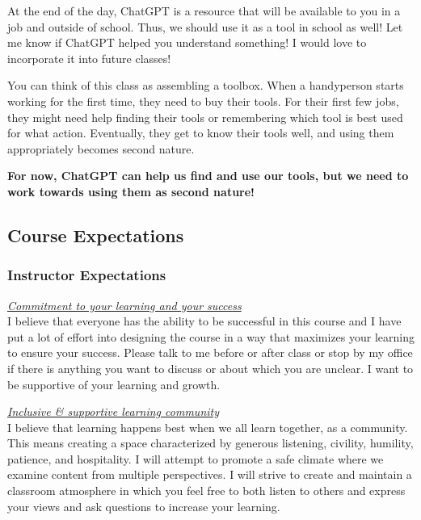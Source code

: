 \documentclass[
  letterpaper,
  DIV=11,
  numbers=noendperiod]{scrartcl}
\begin{document}
At the end of the day, ChatGPT is a resource that will be available to
you in a job and outside of school. Thus, we should use it as a tool in
school as well! Let me know if ChatGPT helped you understand something!
I would love to incorporate it into future classes!

\begin{tcolorbox}[enhanced jigsaw, colbacktitle=quarto-callout-important-color!10!white, bottomrule=.15mm, title=\textcolor{quarto-callout-important-color}{\faExclamation}\hspace{0.5em}{Important}, breakable, colframe=quarto-callout-important-color-frame, toprule=.15mm, bottomtitle=1mm, colback=white, leftrule=.75mm, coltitle=black, arc=.35mm, titlerule=0mm, opacityback=0, opacitybacktitle=0.6, rightrule=.15mm, left=2mm, toptitle=1mm]

You can think of this class as assembling a toolbox. When a handyperson
starts working for the first time, they need to buy their tools. For
their first few jobs, they might need help finding their tools or
remembering which tool is best used for what action. Eventually, they
get to know their tools well, and using them appropriately becomes
second nature.

\textbf{For now, ChatGPT can help us find and use our tools, but we need
to work towards using them as second nature!}

\end{tcolorbox}

\subsection{Course Expectations}\label{course-expectations}

\subsubsection{Instructor Expectations}\label{instructor-expectations}

\ul{\emph{Commitment to your learning and your success\\
}}I believe that everyone has the ability to be successful in this
course and I have put a lot of effort into designing the course in a way
that maximizes your learning to ensure your success. Please talk to me
before or after class or stop by my office if there is anything you want
to discuss or about which you are unclear. I want to be supportive of
your learning and growth.

\ul{\emph{Inclusive \& supportive learning community}}\\
I believe that learning happens best when we all learn together, as a
community. This means creating a space characterized by generous
listening, civility, humility, patience, and hospitality. I will attempt
to promote a safe climate where we examine content from multiple
perspectives. I will strive to create and maintain a classroom
atmosphere in which you feel free to both listen to others and express
your views and ask questions to increase your learning.
\end{document}
